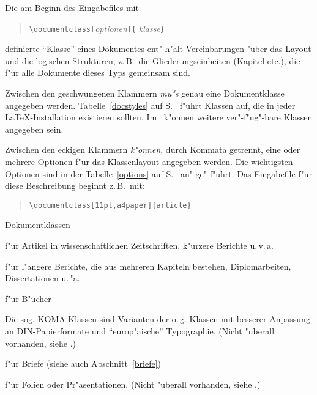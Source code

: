 Die am Beginn des Eingabefiles  mit
\begin{verse}
\verb|\documentclass[|\textit{optionen}\verb|]{|%
  \textit{klasse}\verb|}|
\end{verse}
definierte "`Klasse"' eines Dokumentes ent"-h"alt 
Vereinbarungen "uber 
das Layout und die logischen Strukturen, z.\,B.\ die 
Gliederungseinheiten (Kapitel etc.\@), 
die f"ur alle Dokumente dieses Typs gemeinsam sind.

Zwischen den geschwungenen Klammern \emph{mu"s} genau eine Dokumentklasse
angegeben werden.  Tabelle~\ref{docstyles} auf S.~\pageref{docstyles}
f"uhrt Klassen auf,
die in jeder \LaTeX-Installation existieren sollten.  
Im \local\ k"onnen weitere ver"-f"ug"-bare 
Klassen angegeben sein.  
 
Zwischen den eckigen Klammern \emph{k"onnen}, durch Kommata getrennt, 
eine oder mehrere Optionen f"ur das Klassenlayout
angegeben werden. Die wichtigsten Optionen sind in der 
Tabelle~\ref{options} auf S.~\pageref{options} an"-ge"-f"uhrt.
Das Eingabefile f"ur diese Beschreibung beginnt z.\,B.\ mit:
\begin{verse}
\verb|\documentclass[11pt,a4paper]{article}|
\end{verse}

\begin{table}[hbpt]
\caption{Dokumentklassen} \label{docstyles}
\oben{11cm}
\begin{ttdescription}%
\item [article] f"ur Artikel in wissenschaftlichen Zeitschriften,
  k"ur\-ze\-re Berichte u.\,v.\,a.
 
\item [report] f"ur l"angere Berichte, die aus mehreren Kapiteln
  bestehen, Diplomarbeiten, Dissertationen u.\,"a.
 
\item [book] f"ur B"ucher

\item[scrartcl, scrreprt, scrbook]\quad Die sog. KOMA-Klassen 
sind Varianten der o.\,g. Klassen
mit besserer Anpassung an DIN-Papierformate und "`euro\-p"aische"'
Typographie. 
(Nicht "uberall vorhanden, siehe \local.)


\item [letter] f"ur Briefe (siehe auch Abschnitt~\ref{briefe})

\item [foils] f"ur Folien oder Pr"asentationen.
(Nicht "uberall vorhanden, siehe \local.)
  
\end{ttdescription}
\unten
\end{table}


